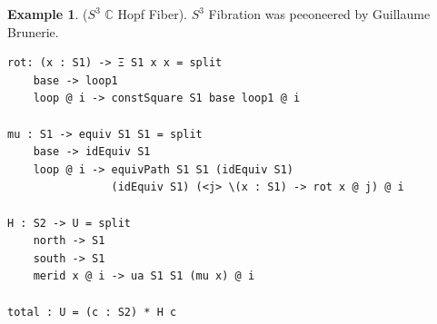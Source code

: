\documentclass{article}
\theoremstyle{definition}
\newtheorem{example}{Example}
\begin{document}

\newpage
\begin{example} ($S^3$ $\mathbb{C}$  Hopf Fiber).
$S^3$ Fibration was peeoneered by Guillaume Brunerie.
\begin{lstlisting}
rot: (x : S1) -> Ξ S1 x x = split
    base -> loop1
    loop @ i -> constSquare S1 base loop1 @ i

mu : S1 -> equiv S1 S1 = split
    base -> idEquiv S1
    loop @ i -> equivPath S1 S1 (idEquiv S1)
                (idEquiv S1) (<j> \(x : S1) -> rot x @ j) @ i

H : S2 -> U = split
    north -> S1
    south -> S1
    merid x @ i -> ua S1 S1 (mu x) @ i

total : U = (c : S2) * H c
\end{lstlisting}
\end{example}

\end{document}
